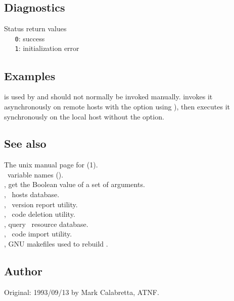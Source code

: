 \subsection*{Diagnostics}

Status return values
\\ \verb+   0+: success
\\ \verb+   1+: initialization error

\subsection*{Examples}

 is used by  and should not normally be invoked
manually.   invokes it asynchronously on remote hosts with the
 option using ), then executes it synchronously on
the local host without the  option.

\subsection*{See also}

The unix manual page for (1).\\
\aipspp\ variable names ().\\
, get the Boolean value of a set of arguments.\\
, \aipspp\ hosts database.\\
, \aipspp\ version report utility.\\
, \aipspp\ code deletion utility.\\
, query \aipspp\ resource database.\\
, \aipspp\ code import utility.\\
, GNU makefiles used to rebuild \aipspp.

\subsection*{Author}

Original: 1993/09/13 by Mark Calabretta, ATNF.
